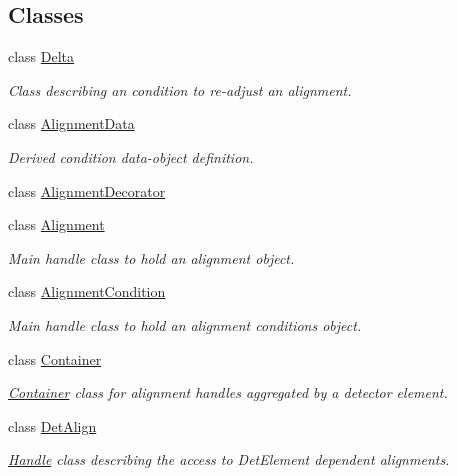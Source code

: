 \subsection*{Classes}
\begin{DoxyCompactItemize}
\item 
class \hyperlink{class_d_d4hep_1_1_alignments_1_1_delta}{Delta}
\begin{DoxyCompactList}\small\item\em Class describing an condition to re-\/adjust an alignment. \item\end{DoxyCompactList}\item 
class \hyperlink{class_d_d4hep_1_1_alignments_1_1_alignment_data}{AlignmentData}
\begin{DoxyCompactList}\small\item\em Derived condition data-\/object definition. \item\end{DoxyCompactList}\item 
class \hyperlink{class_d_d4hep_1_1_alignments_1_1_alignment_decorator}{AlignmentDecorator}
\item 
class \hyperlink{class_d_d4hep_1_1_alignments_1_1_alignment}{Alignment}
\begin{DoxyCompactList}\small\item\em Main handle class to hold an alignment object. \item\end{DoxyCompactList}\item 
class \hyperlink{class_d_d4hep_1_1_alignments_1_1_alignment_condition}{AlignmentCondition}
\begin{DoxyCompactList}\small\item\em Main handle class to hold an alignment conditions object. \item\end{DoxyCompactList}\item 
class \hyperlink{class_d_d4hep_1_1_alignments_1_1_container}{Container}
\begin{DoxyCompactList}\small\item\em \hyperlink{class_d_d4hep_1_1_alignments_1_1_container}{Container} class for alignment handles aggregated by a detector element. \item\end{DoxyCompactList}\item 
class \hyperlink{class_d_d4hep_1_1_alignments_1_1_det_align}{DetAlign}
\begin{DoxyCompactList}\small\item\em \hyperlink{class_d_d4hep_1_1_handle}{Handle} class describing the access to DetElement dependent alignments. \item\end{DoxyCompactList}\item 

\end{DoxyCompactItemize}
